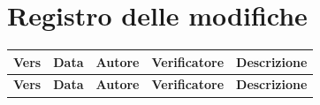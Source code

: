 \section*{Registro delle modifiche}

\renewcommand{\arraystretch}{1.15}
\begin{longtable}{|p{}|p{}|p{}|p{}|p{}|}
    \hline
    \rowcolor[gray]{0.9}
    \textbf{Vers} & \textbf{Data} & \textbf{Autore} & \textbf{Verificatore} & \textbf{Descrizione} \\
    \hline
    \endfirsthead
    
    \hline
    \rowcolor[gray]{0.9}
    \textbf{Vers} & \textbf{Data} & \textbf{Autore} & \textbf{Verificatore} & \textbf{Descrizione} \\
    \hline
    \endhead


\end{longtable}
